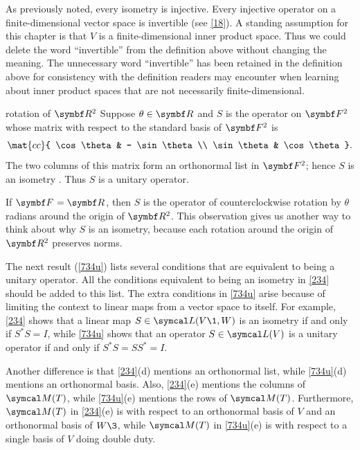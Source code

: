 As previously noted, every isometry is injective. Every injective operator on a finite-dimensional vector space is invertible (see \ref{18}). A standing assumption for this chapter is that $V$ is a finite-dimensional inner product space. Thus we could delete the word \mbox{``invertible''} from the definition above without changing the meaning. The unnecessary word ``invertible'' has been retained in the definition above for consistency with the definition readers may encounter when learning about inner product spaces that are not necessarily finite-dimensional.

\begin{example}{rotation of\/ $\R2$}
Suppose $\theta \in \R{}$ and $S$ is the operator on $\F{2}$ whose matrix with respect to the standard basis of $\F{2}$ is
\[
\mat{cc}{
\cos \theta & - \sin \theta \\
\sin \theta & \cos \theta}.
\]
The two columns of this matrix form an orthonormal list in $\F{2}$; hence $S$ is an isometry . Thus $S$ is a unitary operator.

If $\F{} = \R{}$, then $S$ is the operator of counterclockwise rotation by $\theta$ radians around the origin of $\R{2}$. This observation gives us another way to think about why $S$ is an isometry, because each rotation around the origin of $\R{2}$ preserves norms.
\end{example}

The next result (\ref{734u}) lists several conditions that are equivalent to being a unitary operator. All the conditions equivalent to being an isometry in \ref{234} should be added to this list. The extra conditions in \ref{734u} arise because of limiting the context to linear maps from a vector space to itself. For example, \ref{234} shows that a linear map $S\in\L(V\1, W)$ is an isometry if and only if $S^* S = I$, while \ref{734u} shows that an operator $S \in \L(V)$ is a unitary operator if and only if $S^* S = SS^* = I$.

Another difference is that \ref{234}(d) mentions an orthonormal list, while \ref{734u}(d) mentions an orthonormal basis. Also, \ref{234}(e) mentions the columns of $\M(T)$, while \ref{734u}(e) mentions the rows of $\M(T)$. Furthermore, $\M(T)$ in \ref{234}(e) is with respect to an orthonormal basis of $V$ and an orthonormal basis of $W\3$, while $\M(T)$ in \ref{734u}(e) is with respect to a single basis of $V$ doing double duty.

\pagebreak[3]

